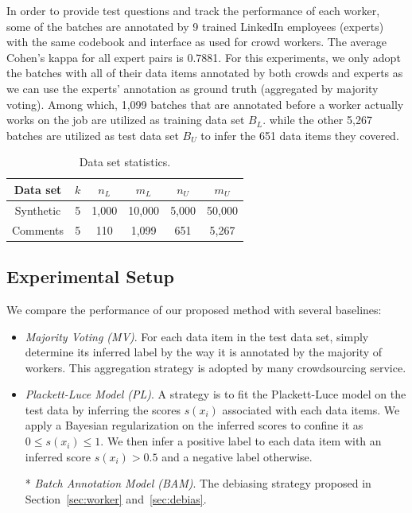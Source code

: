 In order to provide test questions and track the performance of each worker, 
some of the batches are annotated by 9 trained LinkedIn employees (experts) with the same codebook and interface as used for crowd workers.  
The average Cohen's kappa for all expert pairs is 0.7881.  
For this experiments, we only adopt the batches with all of their data items annotated by both crowds and experts 
as we can use the experts' annotation as ground truth (aggregated by majority voting).  
Among which, 1,099 batches that are annotated before a worker actually works on the job 
are utilized as training data set $B_L$.  
while the other 5,267 batches are utilized as test data set $B_U$ to infer the 651 data items they covered.  


\begin{table}[!t]
\centering
 {\caption{Data set statistics.}\label{tab:dataset}}
{
  \begin{tabular}{c||c|c|c|c|c}
  \hline
  Data set & $k$ & $n_L$  &  $m_L$ & $n_U$  & $m_U$ \\ \hline \hline
 Synthetic & 5 & 1,000 & 10,000 & 5,000 & 50,000 \\ \hline 
 Comments  & 5 & 110   & 1,099  & 651   & 5,267  \\ \hline  
  \end{tabular}
}
\end{table}


\subsection{Experimental Setup}

We compare the performance of our proposed method with several baselines:
\begin{itemize}
  \item \emph{Majority Voting (MV)}.
        For each data item in the test data set, 
        simply determine its inferred label by the way it is annotated by the majority of workers.  
        This aggregation strategy is adopted by many crowdsourcing service.  
  \item \emph{Plackett-Luce Model (PL)}.  
        A strategy is to fit the Plackett-Luce model on the test data by inferring the scores $s(x_i)$ associated with each data items.  
        We apply a Bayesian regularization on the inferred scores to confine it as $0 \leq s(x_i) \leq 1$.  
        We then infer a positive label to each data item with an inferred score $s(x_i) > 0.5$ and a negative label otherwise.  
  \item[*] \emph{Batch Annotation Model (BAM)}.  
        The debiasing strategy proposed in Section~\ref{sec:worker} and~\ref{sec:debias}.
\end{itemize}

